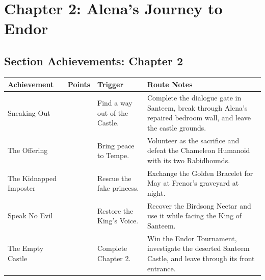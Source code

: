 \documentclass[
  american,
  10pt,
  letterpaper,
  oneside,
  open=any]{scrreprt}
\newcounter{none} %
\newenvironment{guidetable}{%
  \small\setstretch{1.0}%
  \setlength{\tabcolsep}{4pt}%
  \setlength{\LTpre}{8pt}\setlength{\LTpost}{10pt}%
  \renewcommand{\arraystretch}{1.16}%
}{ }
\begin{document}
\chapter{Chapter 2: Alena's Journey to
Endor}\label{chapter-2-alenas-journey-to-endor}

\section{Section Achievements: Chapter
2}\label{section-achievements-chapter-2}

\begin{guidetable}

{\def\LTcaptype{none} %
\begin{longtable}[]{@{}
  >{\raggedright\arraybackslash}p{}
  >{\raggedleft\arraybackslash}p{}
  >{\raggedright\arraybackslash}p{}
  >{\raggedright\arraybackslash}p{}@{}}
\toprule\noalign{}
\begin{minipage}[b]{\linewidth}\raggedright
\color{GuideGreen}\bfseries Achievement
\end{minipage} & \begin{minipage}[b]{\linewidth}\raggedleft
\color{GuideGreen}\bfseries Points
\end{minipage} & \begin{minipage}[b]{\linewidth}\raggedright
\color{GuideGreen}\bfseries Trigger
\end{minipage} & \begin{minipage}[b]{\linewidth}\raggedright
\color{GuideGreen}\bfseries Route Notes
\end{minipage} \\
\midrule\noalign{}
\endhead
\bottomrule\noalign{}
\endlastfoot
Sneaking Out & 5 & Find a way out of the Castle. & Complete the dialogue
gate in Santeem, break through Alena's repaired bedroom wall, and leave
the castle grounds. \\
The Offering & 5 & Bring peace to Tempe. & Volunteer as the sacrifice
and defeat the Chameleon Humanoid with its two Rabidhounds. \\
The Kidnapped Imposter & 5 & Rescue the fake princess. & Exchange the
Golden Bracelet for May at Frenor's graveyard at night. \\
Speak No Evil & 5 & Restore the King's Voice. & Recover the Birdsong
Nectar and use it while facing the King of Santeem. \\
The Empty Castle & 10 & Complete Chapter 2. & Win the Endor Tournament,
investigate the deserted Santeem Castle, and leave through its front
entrance. \\
\end{longtable}
}

\end{guidetable}
\end{document}

